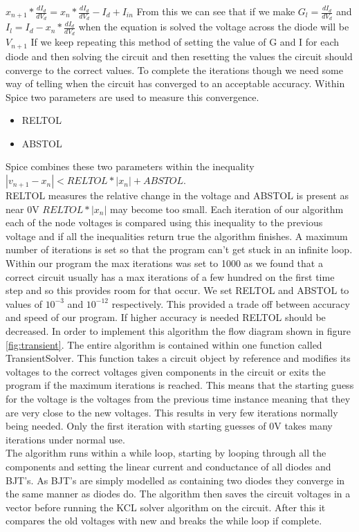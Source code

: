 \documentclass{article}
\begin{document}
$x_{n+1}*\frac{d I_d}{d V_d} = x_n*\frac{d I_d}{d V_d} - I_d + I_{in}$\bigbreak
From this we can see that if we make $G_l = \frac{d I_d}{d V_d}$ and $I_l = I_d - x_n*\frac{d I_d}{d V_d}$ when the equation is solved the voltage across the diode will be $V_{n+1}$\bigbreak
If we keep repeating this method of setting the value of G and I for each diode and then solving the circuit and then resetting the values the circuit should converge to the correct values. To complete the iterations though we need some way of telling when the circuit has converged to an acceptable accuracy. 
Within Spice two parameters are used to measure this convergence.
\begin{itemize}
    \item RELTOL
    \item ABSTOL
\end{itemize}
Spice combines these two parameters within the inequality $|v_{n+1}-x_n| < RELTOL*|x_n| + ABSTOL$.\\
RELTOL measures the relative change in the voltage and ABSTOL is present as near 0V $RELTOL*|x_n|$ may become too small. Each iteration of our algorithm each of the node voltages is compared using this inequality to the previous voltage and if all the inequalities return true the algorithm finishes. A maximum number of iterations is set so that the program can't get stuck in an infinite loop. Within our program the max iterations was set to 1000 as we found that a correct circuit usually has a max iterations of a few hundred on the first time step and so this provides room for that occur. We set RELTOL and ABSTOL to values of $10^{-3}$ and $10^{-12}$ respectively. This provided a trade off between accuracy and speed of our program. If higher accuracy is needed RELTOL should be decreased. 
\bigbreak
In order to implement this algorithm the flow diagram shown in figure \ref{fig:transient}. The entire algorithm is contained within one function called TransientSolver. This function takes a circuit object by reference and modifies its voltages to the correct voltages given components in the circuit or exits the program if the maximum iterations is reached. This means that the starting guess for the voltage is the voltages from the previous time instance meaning that they are very close to the new voltages. This results in very few iterations normally being needed. Only the first iteration with starting guesses of 0V takes many iterations under normal use. \\

The algorithm runs within a while loop, starting by looping through all the components and setting the linear current and conductance of all diodes and BJT's. As BJT's are simply modelled as containing two diodes they converge in the same manner as diodes do. The algorithm then saves the circuit voltages in a vector before running the KCL solver algorithm on the circuit. After this it compares the old voltages with new and breaks the while loop if complete.  
\end{document}
